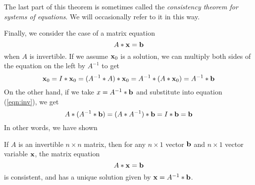 \documentclass{ximera}
\begin{document}
The last part of this theorem is sometimes called the {\it consistency theorem for systems of equations}. We will occasionally refer to it in this way. 


Finally, we consider the case of a matrix equation
\begin{equation}\label{eqn:inv}
A*{\bf x} = {\bf b}
\end{equation}
when $A$ is invertible. If we assume ${\bf x}_0$ is a solution, we can multiply both sides of the equation on the left by $A^{-1}$ to get
\[
{\bf x}_0 = I*{\bf x}_0 = (A^{-1}*A)*{\bf x}_0 = A^{-1}*(A*{\bf x}_0) = A^{-1}*{\bf b}
\]
On the other hand, if we take $x = A^{-1}*{\bf b}$ and substitute into equation (\ref{eqn:inv}), we get
\[
A*(A^{-1}*{\bf b}) = (A*A^{-1})*{\bf b} = I*{\bf b} = {\bf b}
\]
In other words, we have shown

\begin{theorem} If $A$ is an invertible $n\times n$ matrix, then for any $n\times 1$ vector ${\bf b}$ and $n\times 1$ vector variable ${\bf x}$, the matrix equation
\[
A*{\bf x} = {\bf b}
\]
is consistent, and has a unique solution given by ${\bf x} = A^{-1}*{\bf b}$.
\end{theorem}
\end{document}
